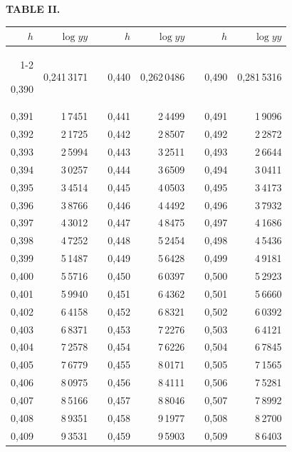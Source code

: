 \endgroup
\clearpage
{}
\begingroup
\centering
\fontsize{9}{9}\selectfont
\setlength{\tabcolsep}{8pt}
\renewcommand{\arraystretch}{1}
\setlength{\parskip}{0pt}
\textbf{TABLE II.}
\par\vspace{7pt}
\begin{tabular}{|r|r|@{}p{9pt}@{}|r|r|@{}p{9pt}@{}|r|r|}
\hline
\rule{0pt}{8.5pt}\(h\) & \(\log yy\) & & \(h\) & \(\log yy\) & & \(h\) & \(\log yy\) \\
\cline{1-2}\cline{4-5}\cline{7-8}
\rule{0pt}{8.5pt}0,390 & 0,241\,3171 &  & 0,440 & 0,262\,0486 &  & 0,490 & 0,281\,5316 \\
0,391 & 1\,7451 &  & 0,441 & 2\,4499 &  & 0,491 & 1\,9096 \\
0,392 & 2\,1725 &  & 0,442 & 2\,8507 &  & 0,492 & 2\,2872 \\
0,393 & 2\,5994 &  & 0,443 & 3\,2511 &  & 0,493 & 2\,6644 \\
0,394 & 3\,0257 &  & 0,444 & 3\,6509 &  & 0,494 & 3\,0411 \\
0,395 & 3\,4514 &  & 0,445 & 4\,0503 &  & 0,495 & 3\,4173 \\[3pt]
0,396 & 3\,8766 &  & 0,446 & 4\,4492 &  & 0,496 & 3\,7932 \\
0,397 & 4\,3012 &  & 0,447 & 4\,8475 &  & 0,497 & 4\,1686 \\
0,398 & 4\,7252 &  & 0,448 & 5\,2454 &  & 0,498 & 4\,5436 \\
0,399 & 5\,1487 &  & 0,449 & 5\,6428 &  & 0,499 & 4\,9181 \\
0,400 & 5\,5716 &  & 0,450 & 6\,0397 &  & 0,500 & 5\,2923 \\[3pt]
0,401 & 5\,9940 &  & 0,451 & 6\,4362 &  & 0,501 & 5\,6660 \\
0,402 & 6\,4158 &  & 0,452 & 6\,8321 &  & 0,502 & 6\,0392 \\
0,403 & 6\,8371 &  & 0,453 & 7\,2276 &  & 0,503 & 6\,4121 \\
0,404 & 7\,2578 &  & 0,454 & 7\,6226 &  & 0,504 & 6\,7845 \\
0,405 & 7\,6779 &  & 0,455 & 8\,0171 &  & 0,505 & 7\,1565 \\[3pt]
0,406 & 8\,0975 &  & 0,456 & 8\,4111 &  & 0,506 & 7\,5281 \\
0,407 & 8\,5166 &  & 0,457 & 8\,8046 &  & 0,507 & 7\,8992 \\
0,408 & 8\,9351 &  & 0,458 & 9\,1977 &  & 0,508 & 8\,2700 \\
0,409 & 9\,3531 &  & 0,459 & 9\,5903 &  & 0,509 & 8\,6403 \\

\end{tabular}
